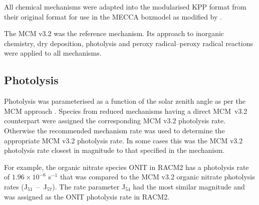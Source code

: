 All chemical mechanisms were adapted into the modularised KPP \citep{Damian:2002} format from their original format for use in the MECCA boxmodel \citep{Sander:2005} as modified by \citep{Butler:2011}.

The MCM v3.2 \citep{Jenkin:1997, Jenkin:2003, Saunders:2003, Bloss:2005, MCM_Site} was the reference mechanism. 
Its approach to inorganic chemistry, dry deposition, photolysis and peroxy radical--peroxy radical reactions were applied to all mechanisms. 

\subsection{Photolysis} \label{ss:photolysis}
Photolysis was parameterised as a function of the solar zenith angle as per the MCM approach \citep{Saunders:2003}. 
Species from reduced mechanisms having a direct \mbox{MCM v3.2} counterpart were assigned the corresponding MCM v3.2 photolysis rate. 
Otherwise the recommended mechanism rate was used to determine the appropriate MCM v3.2 photolysis rate. 
In some cases this was the MCM v3.2 photolysis rate closest in magnitude to that specified in the mechanism. 

For example, the organic nitrate species ONIT in RACM2 has a photolysis rate of $1.96 \times 10^{-6}$ s$^{-1}$ that was compared to the MCM v3.2 organic nitrate photolysis rates \mbox{(J$_{51}$ -- J$_{57}$)}. 
The rate parameter J$_{54}$ had the most similar magnitude and was assigned as the ONIT photolysis rate in RACM2.

